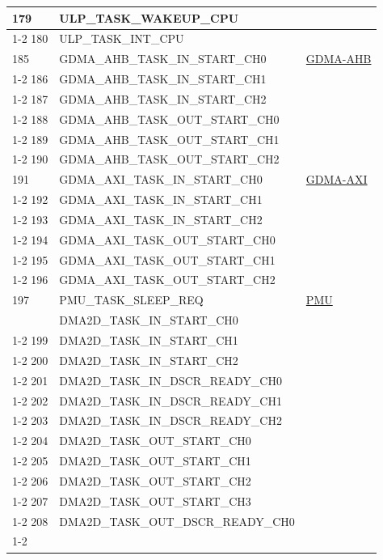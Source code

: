 \documentclass[main\_\_EN.tex]{subfiles}
\begin{document}
\begin{longtable}{ | l | l | l | }
179 & ULP\_TASK\_WAKEUP\_CPU & \nameref{mod:ulp} \\ \cline{1-2}
180 & ULP\_TASK\_INT\_CPU & \\ \hline
185 & GDMA\_AHB\_TASK\_IN\_START\_CH0    & \hyperref[mod:dma]{GDMA-AHB}  \\ \cline{1-2}
186 & GDMA\_AHB\_TASK\_IN\_START\_CH1    & \\ \cline{1-2}
187 & GDMA\_AHB\_TASK\_IN\_START\_CH2    & \\ \cline{1-2}
188 & GDMA\_AHB\_TASK\_OUT\_START\_CH0   & \\ \cline{1-2}
189 & GDMA\_AHB\_TASK\_OUT\_START\_CH1   & \\ \cline{1-2}
190 & GDMA\_AHB\_TASK\_OUT\_START\_CH2   & \\ \hline
191 & GDMA\_AXI\_TASK\_IN\_START\_CH0    & \hyperref[mod:dma]{GDMA-AXI}  \\ \cline{1-2}
192 & GDMA\_AXI\_TASK\_IN\_START\_CH1    & \\ \cline{1-2}
193 & GDMA\_AXI\_TASK\_IN\_START\_CH2    & \\ \cline{1-2}
194 & GDMA\_AXI\_TASK\_OUT\_START\_CH0   & \\ \cline{1-2}
195 & GDMA\_AXI\_TASK\_OUT\_START\_CH1   & \\ \cline{1-2}
196 & GDMA\_AXI\_TASK\_OUT\_START\_CH2   & \\ \hline
197 & PMU\_TASK\_SLEEP\_REQ  & \hyperref[mod:lowpowm]{PMU} \\ \hline
\iftagged{ESP32-P4-latest}{%
198 & DMA2D\_TASK\_IN\_START\_CH0  & \nameref{mod:2ddma} \\ \cline{1-2}
199 & DMA2D\_TASK\_IN\_START\_CH1  & \\ \cline{1-2}
200 & DMA2D\_TASK\_IN\_START\_CH2  & \\ \cline{1-2}
201 & DMA2D\_TASK\_IN\_DSCR\_READY\_CH0  & \\ \cline{1-2}
202 & DMA2D\_TASK\_IN\_DSCR\_READY\_CH1  & \\ \cline{1-2}
203 & DMA2D\_TASK\_IN\_DSCR\_READY\_CH2  & \\ \cline{1-2}
204 & DMA2D\_TASK\_OUT\_START\_CH0  & \\ \cline{1-2}
205 & DMA2D\_TASK\_OUT\_START\_CH1  & \\ \cline{1-2}
206 & DMA2D\_TASK\_OUT\_START\_CH2  & \\ \cline{1-2}
207 & DMA2D\_TASK\_OUT\_START\_CH3  & \\ \cline{1-2}
208 & DMA2D\_TASK\_OUT\_DSCR\_READY\_CH0  & \\ \cline{1-2}
}
\end{longtable}
\end{document}
